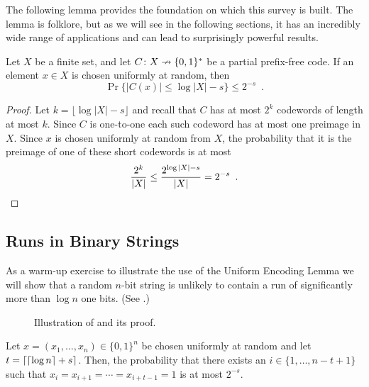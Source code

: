 \documentclass{patmorin}
\begin{document}
The following lemma provides the foundation on which this
survey is built. The lemma is folklore, but as we will see in
the following sections, it has an incredibly wide range of
applications and can lead to surprisingly powerful results.
\begin{lem}
  Let $X$ be a finite set, and 
  let $C\colon X\nrightarrow \{0,1\}^*$ be a partial prefix-free
  code. If an element $x\in X$ is chosen uniformly at random, then
  \[
    \Pr\{|C(x)|\le \log|X|-s\}\le 2^{-s} \enspace .
  \]
\end{lem}

\begin{proof}
  Let $k=\lfloor \log|X|-s \rfloor$ and recall that $C$ has at most $2^{k}$ codewords
  of length at most $k$.  Since $C$ is one-to-one each such codeword
  has at most one preimage in $X$.  Since $x$ is chosen uniformly at
  random from $X$, the probability that it is the preimage of one of
  these short codewords is at most
  \[
  \frac{2^k}{|X|} \leq \frac{2^{\log|X|-s}}{|X|} = 2^{-s} \enspace
  . \qedhere
  \]
\end{proof}

\subsection{Runs in Binary Strings}

As a warm-up exercise to illustrate the use of the Uniform Encoding
Lemma we will show that a random $n$-bit string is unlikely to contain
a run of significantly more than $\log n$ one bits.  (See
.)

\begin{figure}
  \caption{Illustration of  and its proof.}
\end{figure}

\begin{thm}
  Let $x=(x_1,\ldots,x_n)\in\{0,1\}^n$ be chosen uniformly at random
  and let $t = {\left\lceil {\lceil \log n \rceil} + s \right\rceil}$. Then, the probability that
  there exists an $i\in\{1,\ldots,n-t+1\}$ such that
  $x_i=x_{i+1}=\cdots=x_{i+t-1}=1$ is at most $2^{-s}$.
\end{thm}
\end{document}
